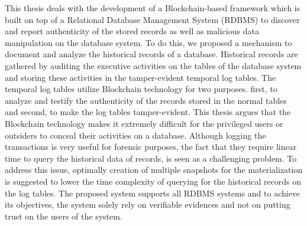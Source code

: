 This thesis deals with the development of a Blockchain-based framework which is built on top of a Relational Database Management System (RDBMS) to discover and report authenticity of the stored records as well as malicious data manipulation on the database system. To do this, we proposed a mechanism to document and analyze the historical records of a database. Historical records are gathered by auditing the executive activities on the tables of the database system and storing these activities in the tamper-evident temporal log tables. The temporal log tables utilize Blockchain technology for two purposes. first, to analyze and testify the authenticity of the records stored in the normal tables and second, to make the log tables tamper-evident. This thesis argues that the Blockchain technology makes it extremely difficult for the privileged users or outsiders to conceal their activities on a database.  
Although logging the transactions is very useful for forensic purposes, the fact that they require linear time to query the historical data of records, is seen as a challenging problem. To address this issue, optimally creation of multiple snapshots for the materialization is suggested to lower the time complexity of querying for the historical records on the log tables.
The proposed system supports all RDBMS systems and to achieve its objectives, the system solely rely on verifiable evidences and not on putting trust on the users of the system.

